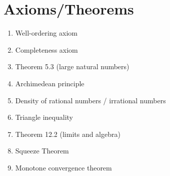 \documentclass[12pt]{amsart}
\begin{document}
\section*{Axioms/Theorems}

\begin{enumerate}
	\item Well-ordering axiom
	\item Completeness axiom

	\item Theorem 5.3 (large natural numbers)
	\item Archimedean principle
	\item Density of rational numbers / irrational numbers
	\item Triangle inequality

	\item Theorem 12.2 (limits and algebra)

	\item Squeeze Theorem
	\item Monotone convergence theorem
					\begin{comment}
	\item Principle of induction
	\item Theorem 18.6 (convergence and subsequences)
	\item Theorem 19.2 (sequence with subsequences converging to every real number)
	\item Cantor's Theorem

	\item Bolzano-Weierstrass

	\item Main corollary of Bolzano-Weierstrass
	\item Cauchy if and only if convergent

	\item Theorem~25.1 (limits and sequences)
	\item Theorem~26.4 (limits of functions and algebra)
	\item Squeeze Theorem for functions

	\item Theorem~27.5 (continuity and limits)
	
	\item Theorem~28.1 (continuity and algebra)
	\item Theorem~28.3 (continuity and compositions)
		\item Intermediate Value Theorem
	\item Boundedness Theorem
	\item Extreme Value Theorem
	

	\item Derivatives and algebra (Theorem 32.9)
	\item Chain rule (Theorem 33.3)
		\item Min-Max Theorem
	\item Mean Value Theorem
	\item Increasing/decreasing functions and derivatives
\end{comment}
\end{enumerate}
\end{document}
